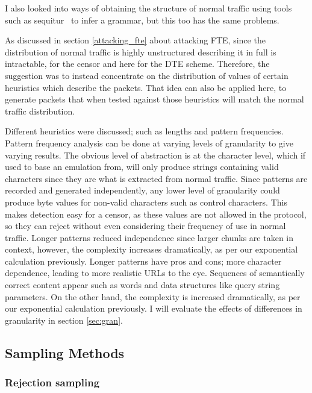 \documentclass[ %
                    author={Samuel Russell},
                supervisor={Prof. Bogdan Warinschi},
                    degree={MEng},
                     title={Innocuous Ciphertexts},
                  subtitle={The DE-CENSOR Scheme},
                      type={Research},
                      year={2018} ]{dissertation}
\begin{document}
I also looked into ways of obtaining the structure of normal traffic using tools such as sequitur~\cite{sequitur} to infer a grammar, but this too has the same problems.

As discussed in section \ref{attacking_fte} about attacking FTE, since the distribution of normal traffic is highly unstructured describing it in full is intractable, for the censor and here for the DTE scheme.
Therefore, the suggestion was to instead concentrate on the distribution of values of certain heuristics which describe the packets.
That idea can also be applied here, to generate packets that when tested against those heuristics will match the normal traffic distribution.

Different heuristics were discussed; such as lengths and pattern frequencies.
Pattern frequency analysis can be done at varying levels of granularity to give varying results.
The obvious level of abstraction is at the character level, which if used to base an emulation from, will only produce strings containing valid characters since they are what is extracted from normal traffic.
Since patterns are recorded and generated independently, any lower level of granularity could produce byte values for non-valid characters such as control characters.
This makes detection easy for a censor, as these values are not allowed in the protocol, so they can reject without even considering their frequency of use in normal traffic.
Longer patterns reduced independence since larger chunks are taken in context, however, the complexity increases dramatically, as per our exponential calculation previously.
Longer patterns have pros and cons; more character dependence, leading to more realistic URLs to the eye. Sequences of semantically correct content appear such as words and data structures like query string parameters. On the other hand, the complexity is increased dramatically, as per our exponential calculation previously.
I will evaluate the effects of differences in granularity in section \ref{sec:gran}.


\subsection{Sampling Methods}

\subsubsection{Rejection sampling}
\end{document}
